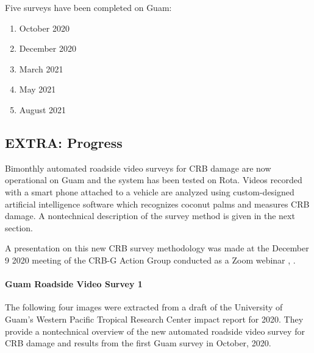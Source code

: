 \documentclass[12pt,letterpaper,english,bibliography=totocnumbered,abstract=on]{scrartcl}
\begin{document}
Five surveys have been completed on Guam:
\begin{enumerate}
	\item October 2020 \cite{mooreCRBDamageWebmap2020} 
	\item December 2020 \cite{mooreCRBDamageWebmap2020a}
	\item March 2021 \cite{mooreCRBDamageWebmap2021}
	\item May 2021 \cite{mooreCRBDamageWebmap2021a}
	\item August 2021 \cite{mooreCRBDamageWebmap2021b}	
\end{enumerate}




\subsection{EXTRA: Progress}

Bimonthly automated roadside video surveys for CRB damage are now operational on Guam and the system has been tested on Rota. Videos recorded with a smart phone attached to a vehicle are analyzed using custom-designed artificial intelligence software which recognizes coconut palms and measures CRB damage. A nontechnical description of the survey method is given in the next section.

A presentation on this new CRB survey methodology was made at the December 9 2020 meeting of the CRB-G Action Group conducted as a Zoom webinar \cite{mooreVideoRecordingCRBG2020}, \cite{mooreAutomatedRoadsideVideo2020}.

\paragraph{Guam Roadside Video Survey 1}

The following four images were extracted from a draft of the University of Guam's Western Pacific Tropical Research Center impact report for 2020. They provide a nontechnical overview of the new automated roadside video survey for CRB damage and results from the first Guam survey in October, 2020.
\end{document}
